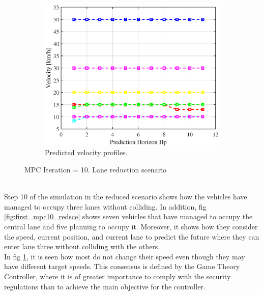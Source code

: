 \begin{figure}[H]
\begin{subfigure}[b]{0.45\textwidth}
    \includegraphics[width=\textwidth]{Kap6/red_lane/red_lane_vel10.eps}
    \caption{Predicted velocity profiles.}
    \label{fig:third_mpc10_redsce}
\end{subfigure}
\caption{MPC Iteration = 10. Lane reduction scenario}
\label{fig:figures}
\end{figure}
\\
Step 10 of the simulation in the reduced scenario shows how the vehicles have managed to occupy three lanes without colliding. In addition, fig  \ref{fig:first_mpc10_redsce} shows seven vehicles that have managed to occupy the central lane and five planning to occupy it. Moreover, it shows how they consider the speed, current position, and current lane to predict the future where they can enter lane three without colliding with the others.
\\

In fig \ref{fig:third_mpc10_redsce}, it is seen how most do not change their speed even though they may have different target speeds. This consensus is defined by the Game Theory Controller, where it is of greater importance to comply with the security regulations than to achieve the main objective for the controller.
\\



